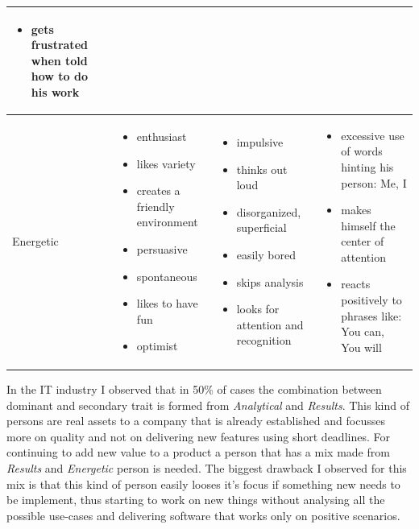 \begin{table}[h]
\begin{tabular}{ | p{} | p{} | p{} | p{} |}
\begin{itemize}
       \item gets frustrated when told how to do his work
      \end{itemize}
     \\ \hline
    Energetic 
     &
      \begin{itemize}
       \item enthusiast
       \item likes variety
       \item creates a friendly environment
       \item persuasive 
       \item spontaneous
       \item likes to have fun
       \item optimist
      \end{itemize}
     &
     \begin{itemize}
      \item impulsive
      \item thinks out loud
      \item disorganized, superficial
      \item easily bored
      \item skips analysis
      \item looks for attention and recognition
     \end{itemize}
     & 
      \begin{itemize}
       \item excessive use of words hinting his person: Me, I 
       \item makes himself the center of attention
       \item reacts positively to phrases like: You can, You will
      \end{itemize}
     \\ \hline
    \end{tabular}
    \label{table:prae}
\end{table}
\FloatBarrier

In the IT industry I observed that in 50\% of cases the combination between dominant and secondary trait is formed from \textit{Analytical} and \textit{Results}. This kind of persons are real assets to a company that is already established and focusses more on quality and not on delivering new features using short deadlines. For continuing to add new value to a product a person that has a mix made from \textit{Results} and \textit{Energetic} person is needed. The biggest drawback I observed for this mix is that this kind of person easily looses it's focus if something new needs to be implement, thus starting to work on new things without analysing all the possible use-cases and delivering software that works only on positive scenarios.
